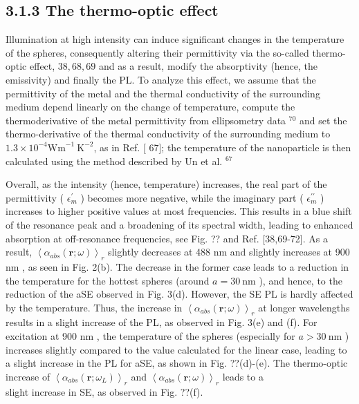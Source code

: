 \documentclass[10pt]{article}
\begin{document}
\subsection*{3.1.3 The thermo-optic effect}
Illumination at high intensity can induce significant changes in the temperature of the spheres, consequently altering their permittivity via the so-called thermo-optic effect, $38,68,69$ and as a result, modify the absorptivity (hence, the emissivity) and finally the PL. To analyze this effect, we assume that the permittivity of the metal and the thermal conductivity of the surrounding medium depend linearly on the change of temperature, compute the thermoderivative of the metal permittivity from ellipsometry data ${ }^{70}$ and set the thermo-derivative of the thermal conductivity of the surrounding medium to $1.3 \times 10^{-4} \mathrm{Wm}^{-1} \mathrm{~K}^{-2}$, as in Ref. [ 67]; the temperature of the nanoparticle is then calculated using the method described by Un et al. ${ }^{67}$

Overall, as the intensity (hence, temperature) increases, the real part of the permittivity ( $\epsilon_{m}^{\prime}$ ) becomes more negative, while the imaginary part ( $\epsilon_{m}^{\prime \prime}$ ) increases to higher positive values at most frequencies. This results in a blue shift of the resonance peak and a broadening of its spectral width, leading to enhanced absorption at off-resonance frequencies, see Fig. ?? and Ref. [38,69-72]. As a result, $\left\langle\alpha_{a b s}(\mathbf{r} ; \omega)\right\rangle_{r}$ slightly decreases at 488 nm and slightly increases at 900 nm , as seen in Fig. 2(b). The decrease in the former case leads to a reduction in the temperature for the hottest spheres (around $a=30 \mathrm{~nm}$ ), and hence, to the reduction of the aSE observed in Fig. 3(d). However, the SE PL is hardly affected by the temperature. Thus, the increase in $\left\langle\alpha_{a b s}(\mathbf{r} ; \omega)\right\rangle_{r}$ at longer wavelengths results in a slight increase of the PL, as observed in Fig. 3(e) and (f). For excitation at 900 nm , the temperature of the spheres (especially for $a>30 \mathrm{~nm}$ ) increases slightly compared to the value calculated for the linear case, leading to a slight increase in the PL for aSE, as shown in Fig. ??(d)-(e). The thermo-optic increase of $\left\langle\alpha_{a b s}\left(\mathbf{r} ; \omega_{L}\right)\right\rangle_{r}$ and $\left\langle\alpha_{a b s}(\mathbf{r} ; \omega)\right\rangle_{r}$ leads to a\\
slight increase in SE, as observed in Fig. ??(f).
\end{document}
